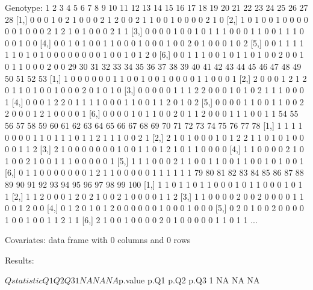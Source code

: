 \documentclass{article}
\begin{document}
\begin{Schunk}
\begin{Soutput}
Genotype:
     1 2 3 4 5 6 7 8 9 10 11 12 13 14 15 16 17 18 19 20 21 22 23 24 25 26 27 28
[1,] 0 0 0 1 0 2 1 0 0  0  2  1  2  0  0  2  1  1  0  0  1  0  0  0  0  2  1  0
[2,] 1 0 1 0 0 1 0 0 0  0  0  0  1  0  0  0  2  1  2  1  0  1  0  0  0  2  1  1
[3,] 0 0 0 0 1 0 0 1 0  1  1  1  0  0  0  1  1  0  0  1  1  1  0  0  0  1  0  0
[4,] 0 0 1 0 1 0 0 1 1  0  0  0  1  0  0  0  1  0  0  2  0  1  0  0  0  1  0  2
[5,] 0 0 1 1 1 1 1 1 0  1  0  1  0  0  0  0  0  0  0  0  1  0  0  1  0  1  2  0
[6,] 0 0 1 1 1 0 0 1 0  1  1  0  1  0  0  2  0  0  1  0  1  1  0  0  0  2  0  0
     29 30 31 32 33 34 35 36 37 38 39 40 41 42 43 44 45 46 47 48 49 50 51 52 53
[1,]  1  0  0  0  0  0  0  1  1  0  0  1  0  0  1  0  0  0  0  1  1  0  0  0  1
[2,]  2  0  0  0  1  2  1  2  0  1  1  0  1  0  0  1  0  0  0  2  0  1  0  1  0
[3,]  0  0  0  0  0  1  1  1  2  2  0  0  0  1  0  1  0  2  1  1  1  0  0  0  1
[4,]  0  0  0  1  2  2  0  1  1  1  1  0  0  0  1  1  0  0  1  1  2  0  1  0  2
[5,]  0  0  0  0  1  1  0  0  1  1  0  0  2  2  0  0  0  1  2  1  0  0  0  0  1
[6,]  0  0  0  0  1  0  1  1  0  0  2  0  1  1  2  0  0  0  1  1  1  0  0  1  1
     54 55 56 57 58 59 60 61 62 63 64 65 66 67 68 69 70 71 72 73 74 75 76 77 78
[1,]  1  1  1  1  0  0  0  0  1  1  0  1  1  1  0  1  1  2  1  1  1  0  0  2  1
[2,]  2  1  0  1  0  0  0  1  0  1  2  2  1  1  0  1  0  1  0  0  0  0  1  1  2
[3,]  2  1  0  0  0  0  0  0  0  1  0  0  1  1  0  1  2  1  0  1  1  0  0  0  0
[4,]  1  1  0  0  0  0  2  1  0  1  0  0  2  1  0  0  1  1  1  0  0  0  0  0  1
[5,]  1  1  1  0  0  0  2  1  1  0  0  1  1  0  0  1  1  0  0  1  0  1  0  0  1
[6,]  0  1  1  0  0  0  0  0  0  0  1  2  1  1  0  0  0  0  0  1  1  1  1  1  1
     79 80 81 82 83 84 85 86 87 88 89 90 91 92 93 94 95 96 97 98 99 100
[1,]  1  1  0  1  1  0  1  1  0  0  0  1  0  1  1  0  0  0  1  0  1   1
[2,]  1  1  2  0  0  0  1  2  0  2  1  0  0  2  1  0  0  0  0  1  1   2
[3,]  1  1  0  0  0  0  2  0  0  2  0  0  0  0  1  1  0  0  1  2  0   0
[4,]  0  1  2  0  1  0  1  2  0  0  0  0  0  0  1  0  0  0  1  0  0   0
[5,]  0  2  0  1  0  0  2  0  0  0  0  1  0  0  1  0  0  1  1  2  1   1
[6,]  2  1  0  0  1  0  0  0  0  2  0  1  0  0  0  0  0  1  1  0  1   1
...

Covariates:
data frame with 0 columns and 0 rows


Results:

$Qstatistic
  Q1 Q2 Q3
1 NA NA NA

$p.value
  p.Q1 p.Q2 p.Q3
1   NA   NA   NA
\end{Soutput}
\end{Schunk}
\end{document}
